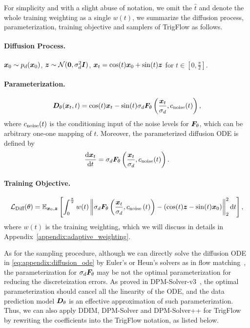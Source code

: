 For simplicity and with a slight abuse of notation, we omit the $\hat{t}$ and denote the whole training weighting as a single $w(t)$, we summarize the diffusion process, parameterization, training objective and samplers of TrigFlow as follows.

\paragraph{Diffusion Process.}
${\bm{x}}_0 \sim p_d({\bm{x}}_0)$, ${\bm{z}} \sim {\mathcal{N}}({\bm{0}}, \sigma_d^2 {\bm{I}})$, ${\bm{x}}_t = \cos(t){\bm{x}}_0 + \sin(t){\bm{z}}$ for $t \in [0,\frac{\pi}{2}]$.

\paragraph{Parameterization.}
\begin{equation}
    {\bm{D}}_\theta({\bm{x}}_t,t) = \cos(t) {\bm{x}}_t - \sin(t) \sigma_d {\bm{F}}_\theta\left(\frac{{\bm{x}}_t}{\sigma_d }, c_{\text{noise}}(t)\right),
\end{equation}
where $c_{\text{noise}}(t)$ is the conditioning input of the noise levels for ${\bm{F}}_\theta$, which can be arbitrary one-one mapping of $t$. Moreover, the parameterized diffusion ODE is defined by
\begin{equation}
\label{eq:appendix:diffusion_ode}
    \frac{\mathrm{d} {\bm{x}}_t}{\mathrm{d} t} = \sigma_d {\bm{F}}_\theta\left(\frac{{\bm{x}}_t}{\sigma_d }, c_{\text{noise}}(t)\right).
\end{equation}

\paragraph{Training Objective.}
\begin{equation}
\label{eq:appendix:trigflow_objective}
    {\mathcal{L}}_{\text{Diff}}(\theta) = \mathbb{E}_{{\bm{x}}_0,{\bm{z}}}\left[
        \int_0^{\frac{\pi}{2}} w(t)
        \left\| \sigma_d{\bm{F}}_\theta\left(\frac{{\bm{x}}_t}{\sigma_d}, c_{\text{noise}}\left(t\right)\right)
        - (\cos(t) {\bm{z}} - \sin(t) {\bm{x}}_0)
        \right\|_2^2 \mathrm{d} t
    \right],
\end{equation}
where $w(t)$ is the training weighting, which we will discuss in details in Appendix~\ref{appendix:adaptive_weighting}.

As for the sampling procedure, although we can directly solve the diffusion ODE in \eqref{eq:appendix:diffusion_ode} by Euler's or Heun's solvers as in flow matching~\citep{lipman2022flowmatching}, the parameterization for $\sigma_d{\bm{F}}_\theta$ may be not the optimal parameterization for reducing the discreteization errors. As proved in DPM-Solver-v3~\citep{zheng2023dpmv3}, the optimal parameterization should cancel all the linearity of the ODE, and the data prediction model ${\bm{D}}_\theta$ is an effective approximation of such parameterization. Thus, we can also apply DDIM, DPM-Solver and DPM-Solver++ for TrigFlow by rewriting the coefficients into the TrigFlow notation, as listed below.

